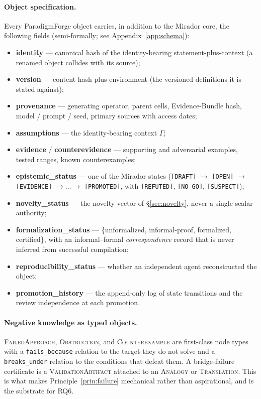 \documentclass[11pt]{article}
\theoremstyle{definition}
\theoremstyle{remark}
\newcommand{\state}[1]{\texttt{[#1]}}
\newcommand{\rel}[1]{\texttt{#1}}
\newcommand{\ntype}[1]{\textsc{#1}}
\newcommand{\PF}{ParadigmForge}
\begin{document}
\paragraph{Object specification.} Every \PF{} object carries, in addition to the Mirador core, the
following fields (semi-formally; see Appendix~\ref{app:schema}):
\begin{itemize}[leftmargin=1.4em,itemsep=1pt]
  \item \textbf{identity} --- canonical hash of the identity-bearing statement-plus-context (a
  renamed object collides with its source);
  \item \textbf{version} --- content hash plus environment (the versioned definitions it is stated
  against);
  \item \textbf{provenance} --- generating operator, parent cells, Evidence-Bundle hash, model /
  prompt / seed, primary sources with access dates;
  \item \textbf{assumptions} --- the identity-bearing context $\Gamma$;
  \item \textbf{evidence} / \textbf{counterevidence} --- supporting and adversarial examples, tested
  ranges, known counterexamples;
  \item \textbf{epistemic\_status} --- one of the Mirador states (\state{DRAFT} $\to$ \state{OPEN}
  $\to$ \state{EVIDENCE} $\to \dots \to$ \state{PROMOTED}, with \state{REFUTED}, \state{NO\_GO},
  \state{SUSPECT});
  \item \textbf{novelty\_status} --- the novelty vector of \S\ref{sec:novelty}, never a single
  scalar authority;
  \item \textbf{formalization\_status} --- \{unformalized, informal-proof, formalized, certified\},
  with an informal--formal \emph{correspondence} record that is never inferred from successful
  compilation;
  \item \textbf{reproducibility\_status} --- whether an independent agent reconstructed the object;
  \item \textbf{promotion\_history} --- the append-only log of state transitions and the review
  independence at each promotion.
\end{itemize}

\paragraph{Negative knowledge as typed objects.} \ntype{FailedApproach}, \ntype{Obstruction}, and
\ntype{Counterexample} are first-class node types with a \rel{fails\_because} relation to the target
they do not solve and a \rel{breaks\_under} relation to the conditions that defeat them. A
bridge-failure certificate is a \ntype{ValidationArtifact} attached to an \ntype{Analogy} or
\ntype{Translation}. This is what makes Principle~\ref{prin:failure} mechanical rather than
aspirational, and is the substrate for RQ6.
\end{document}
